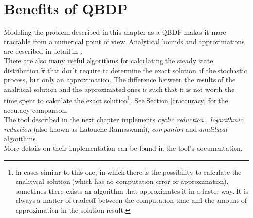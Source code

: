 \section{Benefits of QBDP} \label{benefits}
Modeling the problem described in this chapter as a QBDP makes it more tractable from a numerical point of view. Analytical bounds and approximations are described in detail in \cite{probGuarantees}.\\
There are also many useful algorithms for calculating the steady state distribution \( \overset{\sim}{\pi} \) that don't require to determine the exact solution of the stochastic process, but only an approximation. The difference between the results of the analitical solution and the approximated ones is such that it is not worth the time spent to calculate the exact solution\footnote{In cases similar to this one, in which there is the possibility to calculate the analitycal solution (which has no computation error or approximation), sometimes there exists an algorithm that approximates it in a faster way. It is always a matter of tradeoff between the computation time and the amount of approximation in the solution result.}. See Section \ref{craccuracy} for the accuracy comparison.\\
The tool described in the next chapter implements \emph{cyclic reduction} \cite{cyclic}, \emph{logarithmic reduction} \cite{latouche} (also known as Latouche-Ramaswami), \emph{companion} \cite{probGuarantees} and \emph{analitycal} \cite{probGuarantees} algorithms.\\
More details on their implementation can be found in the tool's documentation.